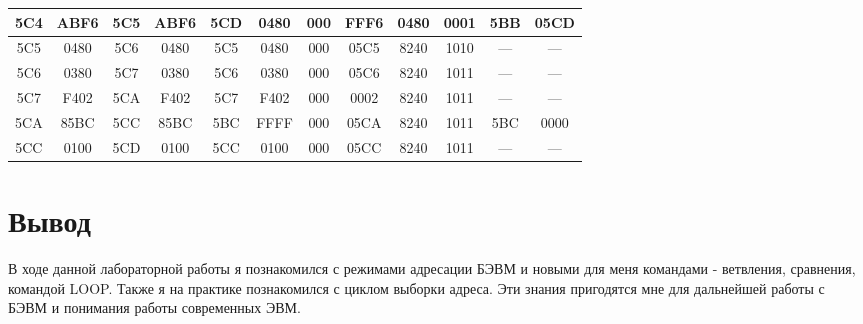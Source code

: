 \begin{center}
\begin{tabular}{|c|c|c|c|c|c|c|c|c|c|c|c|}
\hline
5C4 & ABF6 & 5C5 & ABF6 & 5CD & 0480 & 000 & FFF6 & 0480 & 0001 & 5BB & 05CD\\
\hline
5C5 & 0480 & 5C6 & 0480 & 5C5 & 0480 & 000 & 05C5 & 8240 & 1010 & --- & ---\\
\hline
5C6 & 0380 & 5C7 & 0380 & 5C6 & 0380 & 000 & 05C6 & 8240 & 1011 & --- & ---\\
\hline
5C7 & F402 & 5CA & F402 & 5C7 & F402 & 000 & 0002 & 8240 & 1011 & --- & ---\\
\hline
5CA & 85BC & 5CC & 85BC & 5BC & FFFF & 000 & 05CA & 8240 & 1011 & 5BC & 0000\\
\hline
5CC & 0100 & 5CD & 0100 & 5CC & 0100 & 000 & 05CC & 8240 & 1011 & --- & ---\\
\hline
\end{tabular}
\end{center}

\section{Вывод}
В ходе данной лабораторной работы я познакомился с режимами адресации БЭВМ и новыми для меня командами - ветвления, сравнения, командой LOOP. Также я на практике познакомился с циклом выборки адреса. Эти знания пригодятся мне для дальнейшей работы с БЭВМ и понимания работы современных ЭВМ.
